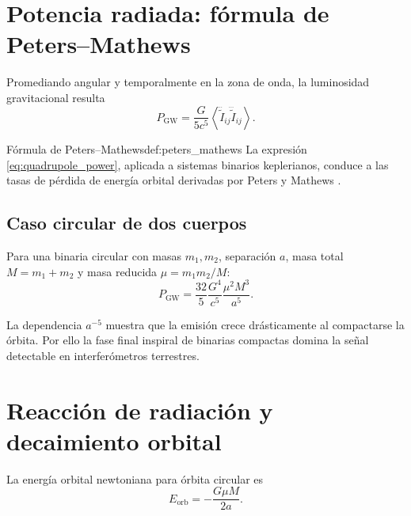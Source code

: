 \section{Potencia radiada: fórmula de Peters--Mathews}
\label{sec:peters_mathews}

Promediando angular y temporalmente en la zona de onda, la luminosidad gravitacional resulta
\begin{equation}
  P_{\mathrm{GW}}=
  \frac{G}{5c^5}
  \left\langle
    \dddot{\tilde I}_{ij}\dddot{\tilde I}_{ij}
  \right\rangle.
  \label{eq:quadrupole_power}
\end{equation}

\begin{definicion}{Fórmula de Peters--Mathews}{def:peters_mathews}
La expresión \eqref{eq:quadrupole_power}, aplicada a sistemas binarios keplerianos, conduce a las tasas de pérdida de energía orbital derivadas por Peters y Mathews \cite{Peters1964}.
\end{definicion}

\subsection{Caso circular de dos cuerpos}

Para una binaria circular con masas $m_1,m_2$, separación $a$, masa total $M=m_1+m_2$ y masa reducida $\mu=m_1m_2/M$:
\begin{equation}
  P_{\mathrm{GW}}=
  \frac{32}{5}
  \frac{G^4}{c^5}
  \frac{\mu^2 M^3}{a^5}.
  \label{eq:power_circular}
\end{equation}

\begin{importante}
La dependencia $a^{-5}$ muestra que la emisión crece drásticamente al compactarse la órbita. Por ello la fase final inspiral de binarias compactas domina la señal detectable en interferómetros terrestres.
\end{importante}

\section{Reacción de radiación y decaimiento orbital}
\label{sec:orbital_decay}

La energía orbital newtoniana para órbita circular es
\begin{equation}
  E_{\mathrm{orb}}=-\frac{G\mu M}{2a}.
\end{equation}

